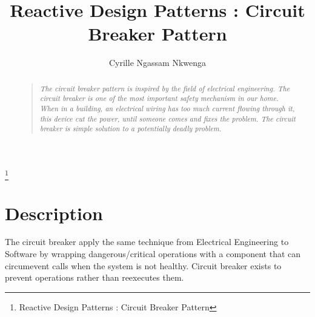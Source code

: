 \documentclass[a4paper,12pt]{article}
\title{Reactive Design Patterns : Circuit Breaker Pattern}
\author{Cyrille Ngassam Nkwenga}
\begin{document}
\maketitle
\tableofcontents
{}


\begin{abstract}
  \begin{quote}
    \textit{The circuit breaker pattern is inspired by the field of electrical engineering.
    The circuit breaker is one of the most important safety mechanism in our home.
    When in a building, an electrical wiring has too much current flowing through it,
    this device cut the power, until someone comes and fixes the problem. The circuit breaker 
    is simple solution to a potentially deadly problem.}
  \end{quote}
\end{abstract}

\footnote{Reactive Design Patterns : Circuit Breaker Pattern}
\section{Description} \label{sec:desc}
  The circuit breaker apply the same technique from Electrical Engineering to Software by 
  wrapping dangerous/critical operations with a component that can circumevent calls when 
  the system is not healthy. Circuit breaker exists to prevent operations rather than reexecutes them.
  
\end{document}
